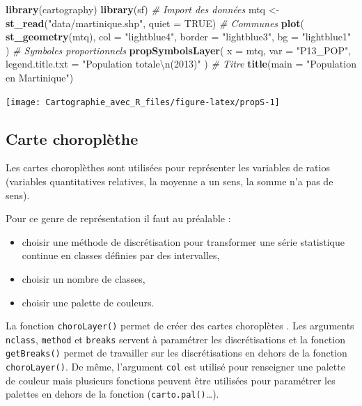 \documentclass[]{book}
\newenvironment{Shaded}{\begin{snugshade}}{\end{snugshade}}
\newcommand{\KeywordTok}[1]{\textcolor[rgb]{0.13,0.29,0.53}{\textbf{#1}}}
\newcommand{\DataTypeTok}[1]{\textcolor[rgb]{0.13,0.29,0.53}{#1}}
\newcommand{\CharTok}[1]{\textcolor[rgb]{0.31,0.60,0.02}{#1}}
\newcommand{\StringTok}[1]{\textcolor[rgb]{0.31,0.60,0.02}{#1}}
\newcommand{\CommentTok}[1]{\textcolor[rgb]{0.56,0.35,0.01}{\textit{#1}}}
\newcommand{\OtherTok}[1]{\textcolor[rgb]{0.56,0.35,0.01}{#1}}
\newcommand{\NormalTok}[1]{#1}
\providecommand{\tightlist}{%
  \setlength{\itemsep}{0pt}\setlength{\parskip}{0pt}}
\begin{document}
\begin{Shaded}
\begin{Highlighting}[]
\KeywordTok{library}\NormalTok{(cartography)}
\KeywordTok{library}\NormalTok{(sf)}
\CommentTok{# Import des données}
\NormalTok{mtq <-}\StringTok{ }\KeywordTok{st_read}\NormalTok{(}\StringTok{"data/martinique.shp"}\NormalTok{, }\DataTypeTok{quiet =} \OtherTok{TRUE}\NormalTok{)}
\CommentTok{# Communes}
\KeywordTok{plot}\NormalTok{(}
  \KeywordTok{st_geometry}\NormalTok{(mtq), }
  \DataTypeTok{col =} \StringTok{"lightblue4"}\NormalTok{, }
  \DataTypeTok{border =} \StringTok{"lightblue3"}\NormalTok{, }
  \DataTypeTok{bg =} \StringTok{"lightblue1"}
\NormalTok{)}
\CommentTok{# Symboles proportionnels}
\KeywordTok{propSymbolsLayer}\NormalTok{(}
  \DataTypeTok{x =}\NormalTok{ mtq, }
  \DataTypeTok{var =} \StringTok{"P13_POP"}\NormalTok{, }
  \DataTypeTok{legend.title.txt =} \StringTok{"Population totale}\CharTok{\textbackslash{}n}\StringTok{(2013)"}
\NormalTok{)}
\CommentTok{# Titre}
\KeywordTok{title}\NormalTok{(}\DataTypeTok{main =} \StringTok{"Population en Martinique"}\NormalTok{)}
\end{Highlighting}
\end{Shaded}

\begin{center}\texttt{[image: Cartographie\_avec\_R\_files/figure-latex/propS-1]} \end{center}

\subsection{Carte choroplèthe}\label{carte-choroplethe}

Les cartes choroplèthes sont utilisées pour représenter les variables de
ratios (variables quantitatives relatives, la moyenne a un sens, la
somme n'a pas de sens).

Pour ce genre de représentation il faut au préalable :

\begin{itemize}
\tightlist
\item
  choisir une méthode de discrétisation pour transformer une série
  statistique continue en classes définies par des intervalles,
\item
  choisir un nombre de classes,
\item
  choisir une palette de couleurs.
\end{itemize}

La fonction \texttt{choroLayer()} permet de créer des cartes choroplètes
. Les arguments \texttt{nclass}, \texttt{method} et \texttt{breaks}
servent à paramétrer les discrétisations et la fonction
\texttt{getBreaks()} permet de travailler sur les discrétisations en
dehors de la fonction \texttt{choroLayer()}. De même, l'argument
\texttt{col} est utilisé pour renseigner une palette de couleur mais
plusieurs fonctions peuvent être utilisées pour paramétrer les palettes
en dehors de la fonction (\texttt{carto.pal()}\ldots{}).
\end{document}
